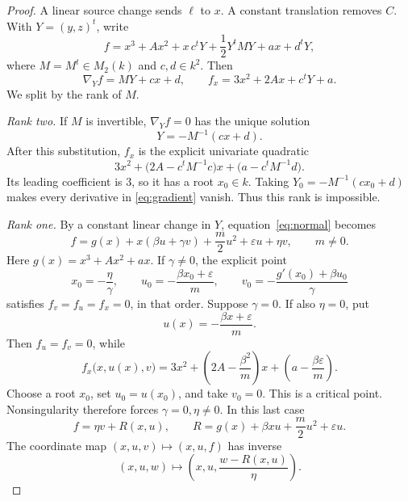 \documentclass[11pt]{article}
\begin{document}
\begin{proof}
A linear source change sends \(\ell\) to \(x\).  A constant translation
removes \(C\).  With \(Y=(y,z)^t\), write
\begin{equation}\label{eq:normal}
 f=x^3+A x^2+x\,c^tY+\frac12Y^tMY+a x+d^tY,
\end{equation}
where \(M=M^t\in M_2(k)\) and \(c,d\in k^2\).  Then
\begin{equation}\label{eq:gradient}
 \nabla_Yf=MY+cx+d,\qquad
 f_x=3x^2+2Ax+c^tY+a.
\end{equation}
We split by the rank of \(M\).

\smallskip
\noindent\emph{Rank two.}
If \(M\) is invertible, \(\nabla_Yf=0\) has the unique solution
\[
Y=-M^{-1}(cx+d).
\]
After this substitution, \(f_x\) is the explicit univariate quadratic
\begin{equation}\label{eq:ranktworesidual}
3x^2+\bigl(2A-c^tM^{-1}c\bigr)x+
       \bigl(a-c^tM^{-1}d\bigr).
\end{equation}
Its leading coefficient is \(3\), so it has a root \(x_0\in k\).
Taking \(Y_0=-M^{-1}(cx_0+d)\) makes every derivative in
\eqref{eq:gradient} vanish.  Thus this rank is impossible.

\smallskip
\noindent\emph{Rank one.}
By a constant linear change in \(Y\), equation~\eqref{eq:normal} becomes
\begin{equation}\label{eq:rankone}
f=g(x)+x(\beta u+\gamma v)+\frac m2u^2+\varepsilon u+\eta v,
\qquad m\ne0.
\end{equation}
Here \(g(x)=x^3+Ax^2+ax\).  If \(\gamma\ne0\), the explicit point
\begin{equation}\label{eq:rankonewitness}
x_0=-\frac{\eta}{\gamma},\qquad
u_0=-\frac{\beta x_0+\varepsilon}{m},\qquad
v_0=-\frac{g'(x_0)+\beta u_0}{\gamma}
\end{equation}
satisfies \(f_v=f_u=f_x=0\), in that order.  Suppose \(\gamma=0\).
If also \(\eta=0\), put
\[
u(x)=-\frac{\beta x+\varepsilon}{m}.
\]
Then \(f_u=f_v=0\), while
\begin{equation}\label{eq:rankoneflat}
f_x\bigl(x,u(x),v\bigr)
=3x^2+\left(2A-\frac{\beta^2}{m}\right)x
  +\left(a-\frac{\beta\varepsilon}{m}\right).
\end{equation}
Choose a root \(x_0\), set \(u_0=u(x_0)\), and take \(v_0=0\).
This is a critical point.  Nonsingularity therefore forces
\(\gamma=0,\eta\ne0\).  In this last case
\[
f=\eta v+R(x,u),\qquad
R=g(x)+\beta xu+\frac m2u^2+\varepsilon u.
\]
The coordinate map \((x,u,v)\mapsto(x,u,f)\) has inverse
\begin{equation}\label{eq:rankoneinverse}
(x,u,w)\longmapsto
\left(x,u,\frac{w-R(x,u)}{\eta}\right).
\end{equation}


\end{proof}
\end{document}
